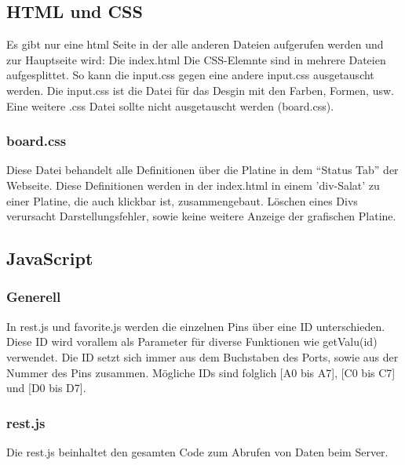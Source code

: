 \subsection{HTML und CSS}
Es gibt nur eine html Seite in der alle anderen Dateien aufgerufen werden und zur
Hauptseite wird: Die index.html\newline
Die CSS-Elemnte sind in mehrere Dateien aufgesplittet. So kann die input.css
gegen eine andere input.css ausgetauscht werden. Die input.css ist die Datei für
das Desgin mit den Farben, Formen, usw.\newline
Eine weitere .css Datei sollte nicht ausgetauscht werden (board.css).

\subsubsection{board.css}
Diese Datei behandelt alle Definitionen über die Platine in dem "`Status
Tab"' der Webseite. Diese Definitionen werden in der index.html in einem 'div-Salat' zu einer
Platine, die auch klickbar ist, zusammengebaut. Löschen eines Divs verursacht
Darstellungsfehler, sowie keine weitere Anzeige der grafischen Platine.

\subsection{JavaScript}
\subsubsection{Generell}
In \textrm{rest.js} und \textrm{favorite.js} werden die einzelnen Pins über eine
ID unterschieden. Diese ID wird vorallem als Parameter für diverse Funktionen wie
\textrm{getValu(id)} verwendet. Die ID setzt sich immer aus dem Buchstaben des
Ports, sowie aus der Nummer des Pins zusammen. Mögliche IDs sind folglich [A0
bis A7], [C0 bis C7] und [D0 bis D7].

\subsubsection{rest.js}
Die \textrm{rest.js} beinhaltet den gesamten Code zum Abrufen von Daten beim
Server.

